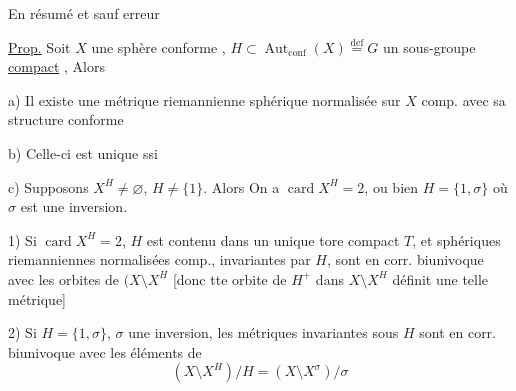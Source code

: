 En résumé et sauf erreur

\uline{Prop.} Soit $X$ une sphère conforme , $H\subset\operatorname{Aut}_{\mathrm{conf}}(X)\overset{\mathrm{def}}=G$ un sous-groupe \uline{compact} , Alors

a) Il existe une métrique riemannienne sphérique normalisée sur $X$ comp. avec sa structure conforme

b) Celle-ci est unique ssi 

 c) Supposons  $X^H\ne\varnothing$, $H\ne\{1\}$. Alors On a  $\operatorname{card}X^H=2$, ou bien $H=\{1,\sigma\}$ où $\sigma$ est une inversion.

1) Si $\operatorname{card}X^H=2$,  $H$ est contenu dans un unique tore compact $T$, et  sphériques riemanniennes normalisées comp., invariantes par  $H$, sont en corr. biunivoque avec les orbites de $(X\setminus X^H$ [donc tte orbite de  $H^+$ dans $X\setminus X^H$ définit une telle métrique]

 2) Si $H=\{1,\sigma\}$, $\sigma$ une inversion, les métriques invariantes sous $H$ sont en corr. biunivoque avec les éléments de
\[
(X\setminus X^H)/H=(X\setminus X^\sigma)/\sigma
\]

